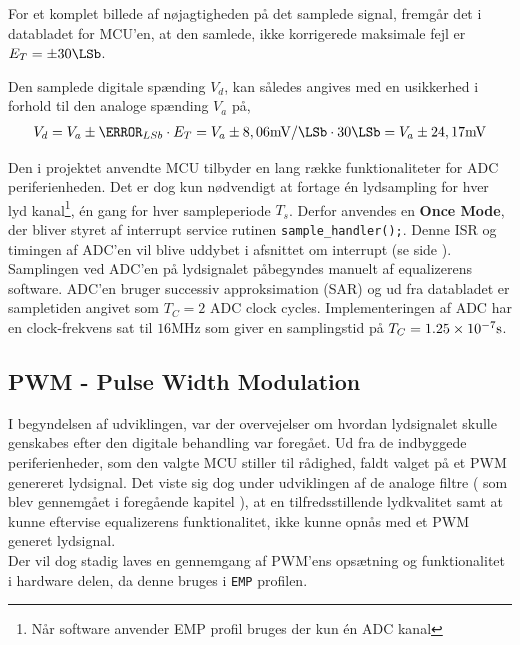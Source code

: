 For et komplet billede af nøjagtigheden på det samplede signal, fremgår det i databladet \cite[afsnit 24.14 s. 1383]{tm4c123gh6pm} for MCU'en, at
den samlede, ikke korrigerede maksimale fejl er $E_T = \pm 30\si{\LSb}$.

Den samplede digitale spænding $V_{d}$, kan således angives med en usikkerhed i forhold til den analoge spænding $V_{a}$ på,
\begin{align}
V_{d} = V_{a} \pm \V_{LSb} \cdot E_T = V_{a} \pm   8,06\si{\milli\volt\per\LSb} \cdot 30 \si{\LSb} = V_{a} \pm 24,17\si{\milli\volt}
\end{align} 

Den i projektet anvendte MCU tilbyder en lang række funktionaliteter for ADC periferienheden.
Det er dog kun nødvendigt at fortage én lydsampling for hver lyd kanal\footnote{Når software anvender EMP profil bruges der kun én ADC kanal}, én gang for hver sampleperiode $T_s$.
Derfor anvendes en \textbf{Once Mode}\cite[afsnit 13.3.7.2, s. 812]{tm4c123gh6pm}, der bliver styret af interrupt service rutinen \texttt{sample\_handler();}. Denne ISR og timingen af ADC'en vil blive uddybet i afsnittet om interrupt (se side \pageref{subsec:interrupt}).\\

Samplingen ved ADC'en på lydsignalet påbegyndes manuelt af equalizerens software.
ADC'en bruger successiv approksimation (SAR) og ud fra databladet er sampletiden angivet som $T_C = 2$ ADC clock cycles. 
Implementeringen af ADC har en clock-frekvens sat til $16 \si{\mega\hertz}$ som giver en samplingstid på $T_C = \num{1,25E-7}\si{\second}$.  

\subsection{PWM - Pulse Width Modulation}\label{subsec:pwm}
I begyndelsen af udviklingen, var der overvejelser om hvordan lydsignalet skulle genskabes efter den digitale behandling var foregået.
Ud fra de indbyggede periferienheder, som den valgte MCU stiller til rådighed, faldt valget på et PWM genereret lydsignal.
Det viste sig dog under udviklingen af de analoge filtre ( som blev gennemgået i foregående kapitel ), at en tilfredsstillende lydkvalitet samt at kunne eftervise equalizerens funktionalitet, ikke kunne opnås med et PWM generet lydsignal. \\
Der vil dog stadig laves en gennemgang af PWM'ens opsætning og funktionalitet i hardware delen, da denne bruges i \texttt{EMP} profilen.\\

